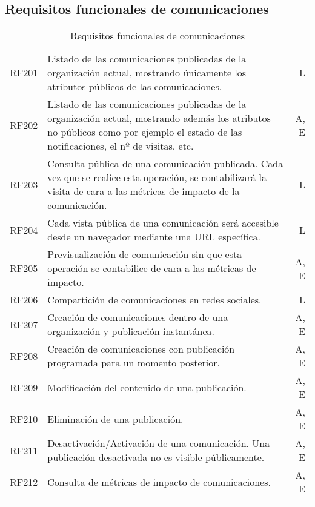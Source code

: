 \subsection{Requisitos funcionales de comunicaciones}
\label{cuadro:requisitos-funcionales-de-comunicaciones}
\begin{longtable}{l|p{13cm}|r}
  RF201\label{RF201} & Listado de las comunicaciones publicadas de la organización actual, mostrando únicamente los atributos públicos de las comunicaciones. & L \\
  RF202\label{RF202} & Listado de las comunicaciones publicadas de la organización actual, mostrando además los atributos no públicos como por ejemplo el estado de las notificaciones, el nº de visitas, etc. & A, E \\
  RF203\label{RF203} & Consulta pública de una comunicación publicada. Cada vez que se realice esta operación, se contabilizará la visita de cara a las métricas de impacto de la comunicación. & L \\
  RF204\label{RF204} & Cada vista pública de una comunicación será accesible desde un navegador mediante una URL específica. & L \\
  RF205\label{RF205} & Previsualización de comunicación sin que esta operación se contabilice de cara a las métricas de impacto. & A, E \\
  RF206\label{RF206} & Compartición de comunicaciones en redes sociales. & L \\
  RF207\label{RF207} & Creación de comunicaciones dentro de una organización y publicación instantánea. & A, E \\
  RF208\label{RF208} & Creación de comunicaciones con publicación programada para un momento posterior. & A, E \\
  RF209\label{RF209} & Modificación del contenido de una publicación. & A, E \\
  RF210\label{RF210} & Eliminación de una publicación. & A, E \\
  RF211\label{RF211} & Desactivación/Activación de una comunicación. Una publicación desactivada no es visible públicamente. & A, E \\
  RF212\label{RF212} & Consulta de métricas de impacto de comunicaciones. & A, E \\
  \caption{Requisitos funcionales de comunicaciones} \\
\end{longtable}

